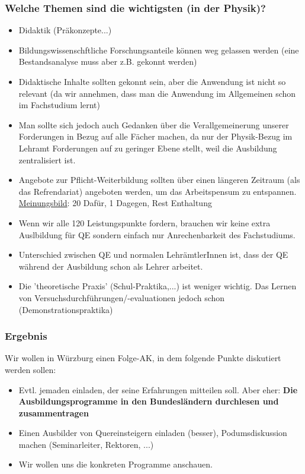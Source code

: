     \subsubsection{Welche Themen sind die wichtigsten (in der Physik)?}
      \begin{itemize}
        \item Didaktik (Präkonzepte...)
        \item Bildungswissenschftliche Forschungsanteile können weg gelassen werden (eine Bestandsanalyse muss aber z.B. gekonnt werden)
        \item Didaktische Inhalte sollten gekonnt sein, aber die Anwendung ist nicht so relevant (da wir annehmen, dass man die Anwendung im Allgemeinen schon im Fachstudium lernt)
        \item Man sollte sich jedoch auch Gedanken über die Verallgemeinerung unserer Forderungen in Bezug auf alle Fächer machen, da nur der Physik-Bezug im Lehramt Forderungen auf zu geringer Ebene stellt, weil die Ausbildung zentralisiert ist.
        \item Angebote zur Pflicht-Weiterbildung sollten über einen längeren Zeitraum (als das Refrendariat) angeboten werden, um das Arbeitspensum zu entspannen.\\ \underline{Meinungsbild}: 20 Dafür, 1 Dagegen, Rest Enthaltung
        \item Wenn wir alle 120 Leistungspunkte fordern, brauchen wir keine extra Auslbildung für QE sondern einfach nur Anrechenbarkeit des Fachstudiums.
        \item Unterschied zwischen QE und normalen LehrämtlerInnen ist, dass der QE während der Ausbildung schon als Lehrer arbeitet.
        \item Die 'theoretische Praxis' (Schul-Praktika,...) ist weniger wichtig. Das Lernen von Versuchsdurchführungen/-evaluationen jedoch schon (Demonstrationspraktika)
      \end{itemize}

    \subsubsection{Ergebnis}
      Wir wollen in Würzburg einen Folge-AK, in dem folgende Punkte diskutiert werden sollen: \\
      \begin{itemize}
        \item Evtl. jemaden einladen, der seine Erfahrungen mitteilen soll. Aber eher: \textbf{Die Ausbildungsprogramme in den Bundesländern durchlesen und zusammentragen}
        \item Einen Ausbilder von Quereinsteigern einladen (besser), Podumsdiskussion machen (Seminarleiter, Rektoren, ...)
        \item Wir wollen uns die konkreten Programme anschauen.
      \end{itemize}

